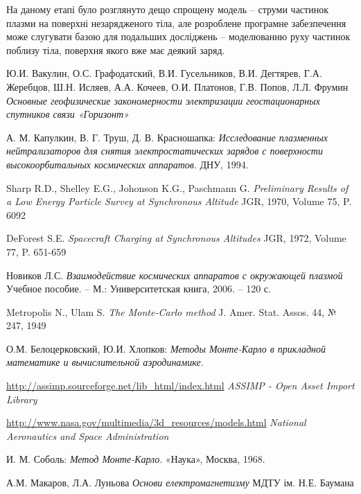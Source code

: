 \documentclass[a4paper,12pt]{article}
\begin{document}
На даному етапі було розглянуто дещо спрощену модель -- струми частинок плазми на поверхні незарядженого тіла, але розроблене програмне забезпечення може слугувати базою для подальших досліджень -- моделюванню руху частинок поблизу тіла, поверхня якого вже має деякий заряд.


\newpage

\begin{thebibliography}{9}

  Ю.И. Вакулин, О.С. Графодатский, В.И. Гусельников, В.И. Дегтярев, Г.А. Жеребцов, Ш.Н. Исляев, А.А. Кочеев, О.И. Платонов, Г.В. Попов, Л.Л. Фрумин
  \emph{Основные геофизические закономерности электризации геостационарных спутников связи «Горизонт»}

  А. М. Капулкин, В. Г. Труш, Д. В. Красношапка:
  \emph{Исследование плазменных нейтрализаторов для снятия электростатических зарядов с поверхности высокоорбитальных космических аппаратов}.
  ДНУ, 1994.

  Sharp R.D., Shelley E.G., Johonson K.G., Paschmann G.
  \emph{Preliminary Results of a Low Energy Particle Survey at Synchronous Altitude}
  JGR, 1970, Volume 75, P. 6092

  DeForest S.E.
  \emph{Spacecraft Charging at Synchronous Altitudes}
  JGR, 1972, Volume 77, P. 651-659

  Новиков Л.С.
  \emph{Взаимодействие космических аппаратов с окружающей плазмой}
  Учебное пособие. -- М.: Университетская книга, 2006. -- 120 с.
  
  Metropolis N., Ulam S.
  \emph{The Monte-Carlo method}
  J. Amer. Stat. Assos. 44,  № 247, 1949

  О.М. Белоцерковский, Ю.И. Хлопков:
  \emph{Методы Монте-Карло в прикладной математике и вычислительной аэродинамике}.

  \url{http://assimp.sourceforge.net/lib_html/index.html}
  \emph{ASSIMP - Open Asset Import Library}
  
  \url{http://www.nasa.gov/multimedia/3d_resources/models.html}
  \emph{National Aeronautics and Space Administration}
  
  И. М. Соболь:
  \emph{Метод Монте-Карло}.
  «Наука», Москва, 1968.
  
    А.М. Макаров, Л.А. Луньова
    \emph{Основи електромагнетизму}
    МДТУ ім. Н.Е. Баумана  
      

\end{thebibliography}
\end{document}

